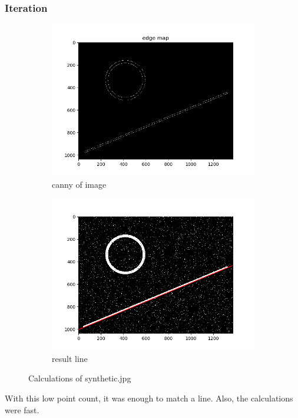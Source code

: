 \documentclass[12pt]{article}
\begin{document}
\subsubsection{Iteration}
\begin{figure}[!htb]
  \centering
  \begin{subfigure}{.5\textwidth}
    \centering
    \includegraphics[width=0.95\linewidth]{pics/hw3_ex_1_synthetic_canny}
    \caption{canny of image}
  \end{subfigure}%
  \begin{subfigure}{.5\textwidth}
    \centering
    \includegraphics[width=0.95\linewidth]{pics/hw3_ex_1_synthetic_result}
    \caption{result line}
   \end{subfigure}
  \caption{Calculations of synthetic.jpg}
\end{figure}
\noindent With this low point count, it was enough to match a line. Also, the calculations were fast.
\newpage
\end{document}
